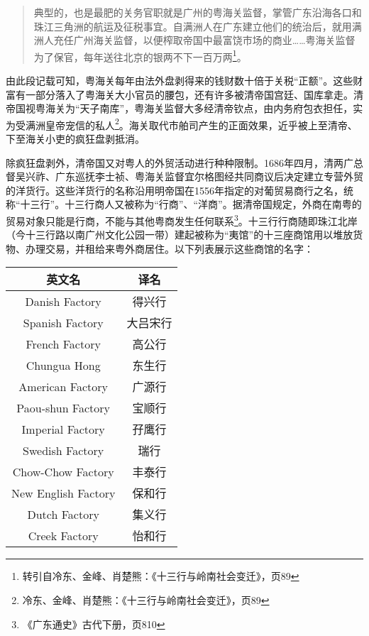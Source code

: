 \begin{quote}

典型的，也是最肥的关务官职就是广州的粤海关监督，掌管广东沿海各口和珠江三角洲的航运及征税事宜。自满洲人在广东建立他们的统治后，就用满洲人充任广州海关监督，以便榨取帝国中最富饶市场的商业……粤海关监督为了保官，每年送往北京的银两不下一百万两\footnote{转引自冷东、金峰、肖楚熊：《十三行与岭南社会变迁》，页89}。

\end{quote}

由此段记载可知，粤海关每年由法外盘剥得来的钱财数十倍于关税“正额”。这些财富有一部分落入了粤海关大小官员的腰包，还有许多被清帝国宫廷、国库拿走。清帝国视粤海关为“天子南库”，粤海关监督大多经清帝钦点，由内务府包衣担任，实为受满洲皇帝宠信的私人\footnote{冷东、金峰、肖楚熊：《十三行与岭南社会变迁》，页89}。海关取代市舶司产生的正面效果，近乎被上至清帝、下至海关小吏的疯狂盘剥抵消。

除疯狂盘剥外，清帝国又对粤人的外贸活动进行种种限制。1686年四月，清两广总督吴兴祚、广东巡抚李士祯、粤海关监督宜尔格图经共同商议后决定建立专营外贸的洋货行。这些洋货行的名称沿用明帝国在1556年指定的对葡贸易商行之名，统称“十三行”。十三行商人又被称为“行商”、“洋商”。据清帝国规定，外商在南粤的贸易对象只能是行商，不能与其他粤商发生任何联系\footnote{《广东通史》古代下册，页810}。十三行行商随即珠江北岸（今十三行路以南广州文化公园一带）建起被称为“夷馆”的十三座商馆用以堆放货物、办理交易，并租给来粤外商居住。以下列表展示这些商馆的名字：

\begin{center}
	\begin{tabular}{cc}
		\hline 
		英文名 & 译名 \\
		
		\hline
		
		Danish Factory & 得兴行 \\
		
		Spanish Factory & 大吕宋行 \\
		
		French Factory & 高公行 \\
		
		Chungua Hong & 东生行 \\
		
		American Factory & 广源行 \\
		
		Paou-shun Factory & 宝顺行 \\
		
		Imperial Factory &  孖鹰行 \\
		
		Swedish Factory & 瑞行 \\
		
		Chow-Chow Factory & 丰泰行 \\
		
		New English Factory & 保和行 \\
		
		Dutch Factory & 集义行 \\
		
		Creek Factory & 怡和行
		
	\end{tabular}
\end{center}

